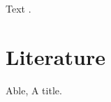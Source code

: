\documentclass{article}
\begin{document}
Text \cite{a}.

\section{Literature}
\begin{enumerate}
 Able, A title.
\end{enumerate}
\end{document}
